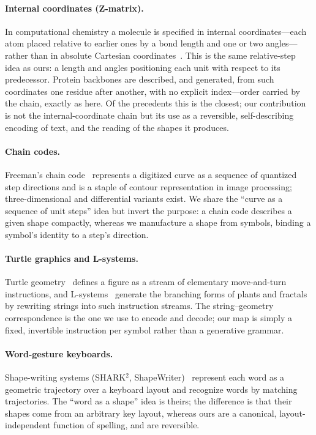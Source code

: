 \documentclass[11pt]{article}
\begin{document}
\paragraph{Internal coordinates (Z-matrix).} In computational chemistry a molecule is
specified in internal coordinates---each atom placed relative to earlier ones by a bond length
and one or two angles---rather than in absolute Cartesian coordinates~\cite{pulay1979}. This is
the same relative-step idea as ours: a length and angles positioning each unit with respect to
its predecessor. Protein backbones are described, and generated, from such coordinates one
residue after another, with no explicit index---order carried by the chain, exactly as here.
Of the precedents this is the closest; our contribution is not the internal-coordinate chain
but its use as a reversible, self-describing encoding of text, and the reading of the shapes
it produces.

\paragraph{Chain codes.} Freeman's chain code~\cite{freeman1961} represents a digitized curve
as a sequence of quantized step directions and is a staple of contour representation in image
processing; three-dimensional and differential variants exist. We share the ``curve as a
sequence of unit steps'' idea but invert the purpose: a chain code describes a given shape
compactly, whereas we manufacture a shape from symbols, binding a symbol's identity to a
step's direction.

\paragraph{Turtle graphics and L-systems.} Turtle geometry~\cite{abelson1981} defines a figure
as a stream of elementary move-and-turn instructions, and L-systems~\cite{lindenmayer1968,
abop1990} generate the branching forms of plants and fractals by rewriting strings into such
instruction streams. The string--geometry correspondence is the one we use to encode and
decode; our map is simply a fixed, invertible instruction per symbol rather than a generative
grammar.

\paragraph{Word-gesture keyboards.} Shape-writing systems (SHARK$^2$,
ShapeWriter)~\cite{zhai2003,kristensson2004,zhai2012} represent each word as a geometric
trajectory over a keyboard layout and recognize words by matching trajectories. The ``word as
a shape'' idea is theirs; the difference is that their shapes come from an arbitrary key
layout, whereas ours are a canonical, layout-independent function of spelling, and are
reversible.
\end{document}
